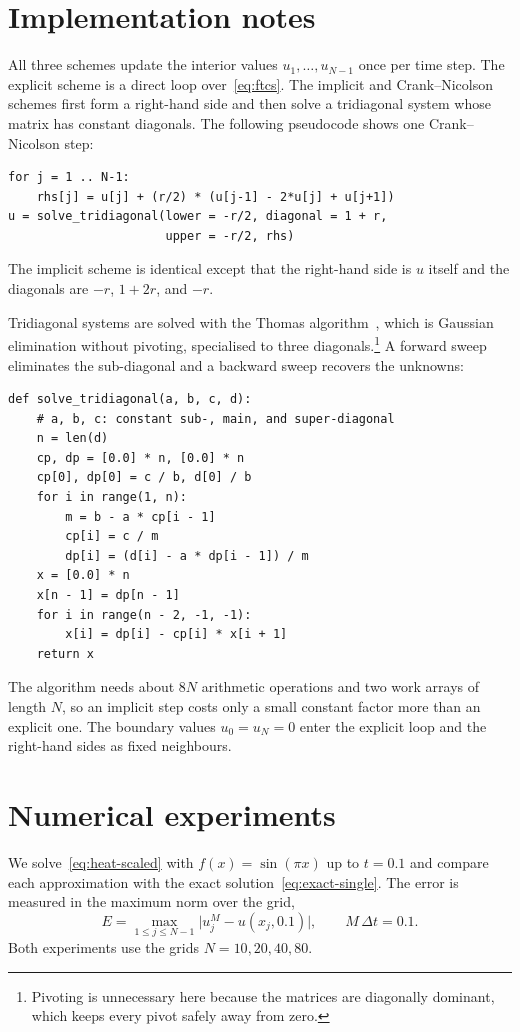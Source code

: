 \documentclass[11pt]{article}
\theoremstyle{definition}
\theoremstyle{remark}
\begin{document}
\section{Implementation notes}\label{sec:implementation}

All three schemes update the interior values $u_1, \ldots, u_{N-1}$ once per time step. The explicit scheme is a direct loop over~\eqref{eq:ftcs}. The implicit and Crank--Nicolson schemes first form a right-hand side and then solve a tridiagonal system whose matrix has constant diagonals. The following pseudocode shows one Crank--Nicolson step:
\begin{verbatim}
for j = 1 .. N-1:
    rhs[j] = u[j] + (r/2) * (u[j-1] - 2*u[j] + u[j+1])
u = solve_tridiagonal(lower = -r/2, diagonal = 1 + r,
                      upper = -r/2, rhs)
\end{verbatim}
The implicit scheme is identical except that the right-hand side is $u$ itself and the diagonals are $-r$, $1 + 2r$, and $-r$.

Tridiagonal systems are solved with the Thomas algorithm~\cite{thomas1949}, which is Gaussian elimination without pivoting, specialised to three diagonals.\footnote{Pivoting is unnecessary here because the matrices are diagonally dominant, which keeps every pivot safely away from zero.} A forward sweep eliminates the sub-diagonal and a backward sweep recovers the unknowns:
\begin{verbatim}
def solve_tridiagonal(a, b, c, d):
    # a, b, c: constant sub-, main, and super-diagonal
    n = len(d)
    cp, dp = [0.0] * n, [0.0] * n
    cp[0], dp[0] = c / b, d[0] / b
    for i in range(1, n):
        m = b - a * cp[i - 1]
        cp[i] = c / m
        dp[i] = (d[i] - a * dp[i - 1]) / m
    x = [0.0] * n
    x[n - 1] = dp[n - 1]
    for i in range(n - 2, -1, -1):
        x[i] = dp[i] - cp[i] * x[i + 1]
    return x
\end{verbatim}
The algorithm needs about $8N$ arithmetic operations and two work arrays of length $N$, so an implicit step costs only a small constant factor more than an explicit one. The boundary values $u_0 = u_N = 0$ enter the explicit loop and the right-hand sides as fixed neighbours.

\section{Numerical experiments}\label{sec:experiments}

We solve~\eqref{eq:heat-scaled} with $f(x) = \sin(\pi x)$ up to $t = 0.1$ and compare each approximation with the exact solution~\eqref{eq:exact-single}. The error is measured in the maximum norm over the grid,
\begin{equation}\label{eq:error}
  E = \max_{1 \le j \le N-1} \bigl| u_j^{M} - u(x_j, 0.1) \bigr|,
  \qquad M \, \Delta t = 0.1 .
\end{equation}
Both experiments use the grids $N = 10, 20, 40, 80$.
\end{document}
